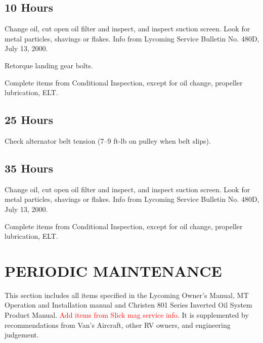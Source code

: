 
\subsection{10 Hours} 
\begin{enumerate*}
	\item Change oil, cut open oil filter and inspect, and inspect suction screen. Look for metal particles, shavings or flakes. Info from Lycoming Service Bulletin No. 480D, July 13, 2000. 
	\item Retorque landing gear bolts.
	\item Complete items from Conditional Inspection, except for oil change, propeller lubrication, ELT. 
\end{enumerate*}

\subsection{25 Hours} 
\begin{enumerate*}
	\item Check alternator belt tension (7--9 ft-lb on pulley when belt slips). 
\end{enumerate*}

\subsection{35 Hours} 
\begin{enumerate*}
	\item Change oil, cut open oil filter and inspect, and inspect suction screen. Look for metal particles, shavings or flakes. Info from Lycoming Service Bulletin No. 480D, July 13, 2000. 
	\item Complete items from Conditional Inspection, except for oil change, propeller lubrication, ELT. 
\end{enumerate*}

\section{PERIODIC MAINTENANCE} This section includes all items specified in the Lycoming Owner's Manual, MT Operation and Installation manual and Christen 801 Series Inverted Oil System Product Manual. \textcolor{red}{Add items from Slick mag service info.} It is supplemented by recommendations from Van's Aircraft, other RV owners, and engineering judgement.

